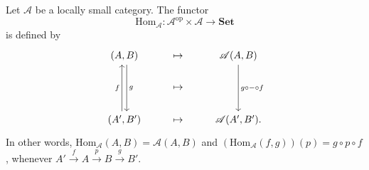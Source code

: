 \begin{definition}
  Let $\mathscr{A}$ be a locally small category. The functor 
  \[
  \mathrm{Hom}_{\mathscr{A}}:\mathscr{A}^{\mathrm{op}}\times \mathscr{A}\to \mathbf{Set}
  \] 
  is defined by
  \[
  \begin{tikzcd}
    (A,B)\arrow[dd,"g", shift left] &\mapsto &\mathscr{A}(A,B)\arrow[dd,"g\circ-\circ f"]\\
    & \mapsto &\\
    (A',B')\arrow[uu,"f",shift left] &\mapsto &\mathscr{A}(A',B'). 
  \end{tikzcd}
  \] 
  In other words, $\mathrm{Hom}_{\mathscr{A}}(A,B)=\mathscr{A}(A,B)$ and $\left( \mathrm{Hom}_{\mathscr{A}}(f,g) \right) (p)=g\circ p\circ f$, whenever $A'\xrightarrow{f}A\xrightarrow{p}B\xrightarrow{g}B'$.
\end{definition}

